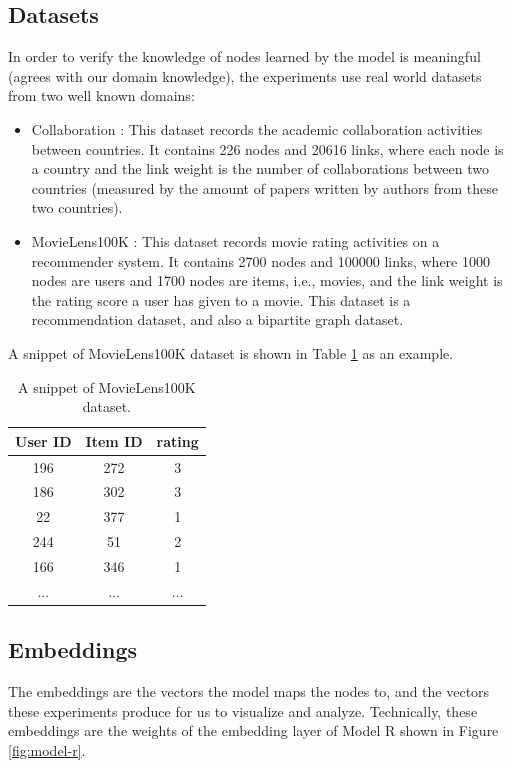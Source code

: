 \documentclass[conference]{IEEEtran}
\begin{document}
\subsection{Datasets}
In order to verify the knowledge of nodes learned by the model is meaningful (agrees with our domain knowledge), the experiments use real world datasets from two well known domains:
\begin{itemize}
	\item Collaboration \cite{pan2012world}: This dataset records the academic collaboration activities between countries.
	It contains 226 nodes and 20616 links, where each node is a country and the link weight is the number of collaborations between two countries (measured by the amount of papers written by authors from these two countries).
	\item MovieLens100K \cite{harper2015movielens}: This dataset records movie rating activities on a recommender system.
	It contains 2700 nodes and 100000 links, where 1000 nodes are users and 1700 nodes are items, i.e., movies, and the link weight is the rating score a user has given to a movie.
	This dataset is a recommendation dataset, and also a bipartite graph dataset.
\end{itemize}
A snippet of MovieLens100K dataset is shown in Table \ref{tab:movielens100k} as an example.
\begin{table}[!ht]
	\centering
	\caption{A snippet of MovieLens100K dataset.}
	\begin{tabular}{ccc}  \hline \rowcolor{blue!30}
		User ID & Item ID & rating \\ \hline
		196 & 272 & 3 \\ \hline
		186 & 302 & 3 \\ \hline
		22 & 377 & 1 \\ \hline
		244 & 51 & 2 \\ \hline
		166 & 346 & 1 \\ \hline
		... & ... & ... \\ \hline
	\end{tabular}
	\label{tab:movielens100k}
\end{table}

\subsection{Embeddings}
The embeddings are the vectors the model maps the nodes to, and the vectors these experiments produce for us to visualize and analyze.
Technically, these embeddings are the weights of the embedding layer of Model R shown in Figure \ref{fig:model-r}.
\end{document}
